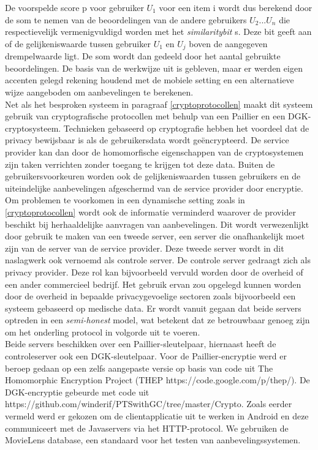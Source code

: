De voorspelde score p voor gebruiker $U_1$ voor een item i wordt dus berekend door de som te nemen van de beoordelingen van de andere gebruikers $U_2 ... U_n$ die respectievelijk vermenigvuldigd worden met het \emph{similaritybit} s. Deze bit geeft aan of de gelijkeniswaarde tussen gebruiker $U_1$ en $U_j$ boven de aangegeven drempelwaarde ligt. De som wordt dan gedeeld door het aantal gebruikte beoordelingen. De basis van de werkwijze uit \cite{ZErkinDyn} is gebleven, maar er werden eigen accenten gelegd rekening houdend met de mobiele setting en een alternatieve wijze aangeboden om aanbevelingen te berekenen. \\Net als het besproken systeem in paragraaf \ref{cryptoprotocollen} maakt dit systeem gebruik van cryptografische protocollen met behulp van een Paillier en een DGK-cryptosysteem. Technieken gebaseerd op cryptografie hebben het voordeel dat de privacy bewijsbaar is als de gebruikersdata wordt ge\"encrypteerd. De service provider kan dan door de homomorfische eigenschappen van de cryptosystemen zijn taken verrichten zonder toegang te krijgen tot deze data. Buiten de gebruikersvoorkeuren worden ook de gelijkeniswaarden tussen gebruikers en de uiteindelijke aanbevelingen afgeschermd van de service provider door encryptie.\\ Om problemen te voorkomen in een dynamische setting zoals in \ref{cryptoprotocollen} wordt ook de informatie verminderd waarover de provider beschikt bij herhaaldelijke aanvragen van aanbevelingen. Dit wordt verwezenlijkt door gebruik te maken van een tweede server, een server die onafhankelijk moet zijn van de server van de service provider. Deze tweede server wordt in dit naslagwerk ook vernoemd als controle server. De controle server gedraagt zich als privacy provider. Deze rol kan bijvoorbeeld vervuld worden door de overheid of een ander commercieel bedrijf. Het gebruik ervan zou opgelegd kunnen worden door de overheid in bepaalde privacygevoelige sectoren zoals bijvoorbeeld een systeem gebaseerd op medische data. Er wordt vanuit gegaan dat beide servers optreden in een \emph{semi-honest} model, wat betekent dat ze betrouwbaar genoeg zijn om het onderling protocol in volgorde uit te voeren. \\ Beide servers beschikken over een Paillier-sleutelpaar, hiernaast heeft de controleserver ook een DGK-sleutelpaar. Voor de Paillier-encryptie werd er beroep gedaan op een zelfs aangepaste versie op basis van code uit The Homomorphic Encryption Project (THEP https://code.google.com/p/thep/). De DGK-encryptie gebeurde met code uit https://github.com/winderif/PTSwithGC/tree/master/Crypto. Zoals eerder vermeld werd er gekozen om de clientapplicatie uit te werken in Android en deze communiceert met de Javaservers via het HTTP-protocol. We gebruiken de MovieLens database, een standaard voor het testen van aanbevelingssystemen.